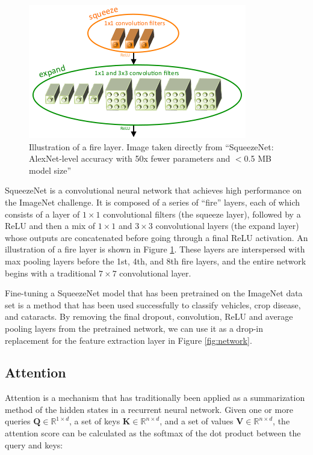 \documentclass[10pt,twocolumn,letterpaper]{article}
\begin{document}
\begin{figure}
\begin{center}
\includegraphics[width=0.6\linewidth]{../images/fire/fire.png}
\end{center}
   \caption{Illustration of a fire layer. Image taken directly from ``SqueezeNet: AlexNet-level accuracy with 50x fewer parameters and $<$0.5 MB model size''\cite{iandola2016squeezenet}}
\label{fig:fire}
\end{figure}

SqueezeNet is a convolutional neural network that achieves high performance on the ImageNet challenge. It is composed of a series of ``fire'' layers, each of which consists of a layer of $1 \times 1$ convolutional filters (the squeeze layer), followed by a ReLU and then a mix of $1 \times 1$ and $3 \times 3$ convolutional layers (the expand layer) whose outputs are concatenated before going through a final ReLU activation. An illustration of a fire layer is shown in Figure \ref{fig:fire}. These layers are interspersed with max pooling layers before the 1st, 4th, and 8th fire layers, and the entire network begins with a traditional $7 \times 7$ convolutional layer.

Fine-tuning a SqueezeNet model that has been pretrained on the ImageNet data set is a method that has been used successfully to classify vehicles\cite{agoes2017fine}, crop disease\cite{durmucs2017disease}, and cataracts\cite{qian2018machine}. By removing the final dropout, convolution, ReLU and average pooling layers from the pretrained network, we can use it as a drop-in replacement for the feature extraction layer in Figure \ref{fig:network}.

\subsection{Attention}
Attention is a mechanism that has traditionally been applied as a summarization method of the hidden states in a recurrent neural network. Given one or more queries $\textbf{Q} \in \mathbb{R}^{1 \times d}$, a set of keys $\textbf{K} \in \mathbb{R}^{n \times d}$, and a set of values $\textbf{V} \in \mathbb{R}^{n \times d}$, the attention score can be calculated as the softmax of the dot product between the query and keys:
\end{document}
